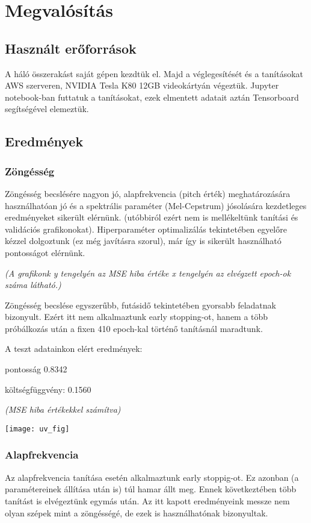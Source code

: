 \section{Megvalósítás}
\subsection{Használt erőforrások}
A háló összerakást saját gépen kezdtük el. Majd a véglegesítését és a tanításokat AWS szerveren, NVIDIA Tesla K80 12GB videokártyán végeztük. Jupyter notebook-ban futtatuk a tanításokat, ezek elmentett adatait aztán Tensorboard segítségével elemeztük.

\subsection{Eredmények}
\subsubsection{Zöngésség}
Zöngésség becslésére nagyon jó, alapfrekvencia (pitch érték) meghatározására használhatóan jó és a spektrális paraméter (Mel-Cepstrum) jósolására kezdetleges eredményeket sikerült elérnünk. (utóbbiról ezért nem is mellékeltünk tanítási és validációs grafikonokat). Hiperparaméter optimalizálás tekintetében egyelőre kézzel dolgoztunk (ez még javításra szorul), már így is sikerült használható pontosságot  elérnünk.

\textit{(A grafikonk y tengelyén az MSE hiba értéke x tengelyén az elvégzett epoch-ok száma látható.)}

\begin{minipage}{0.5\textwidth}
	Zöngésség becslése egyszerűbb, futásidő tekintetében gyorsabb feladatnak bizonyult. Ezért itt nem alkalmaztunk early stopping-ot, hanem a több próbálkozás után a fixen 410 epoch-kal történő tanításnál maradtunk.
	
	A teszt adatainkon elért eredmények:
	
	pontosság 0.8342
	
	költségfüggvény: 0.1560
	
	\textit{(MSE hiba értékekkel számítva)}
\end{minipage}
\begin{minipage}{0.5\textwidth}
	\flushright	
	\texttt{[image: uv\_fig]}
\end{minipage}
\subsubsection{Alapfrekvencia}
Az alapfrekvencia tanítása esetén alkalmaztunk early stoppig-ot. Ez azonban (a paramétereinek állítása után is) túl hamar állt meg. Ennek következtében több tanítást is elvégeztünk egymás után. Az itt kapott eredményeink messze nem olyan szépek mint a zöngésségé, de ezek is használhatónak bizonyultak.

